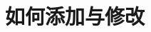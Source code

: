\documentclass[../main.tex]{subfiles}
\begin{document}
\chapter{如何添加与修改}
\vspace{-2cm}
\end{document}
